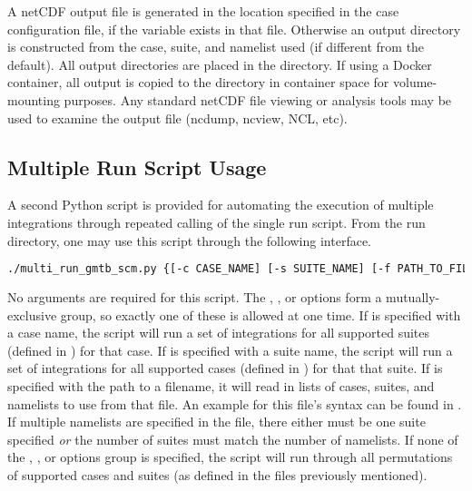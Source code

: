 A netCDF output file is generated in the location specified in the case
configuration file, if the  variable exists in that file. Otherwise an output directory is constructed from the case, suite, and namelist used (if different from the default). All output directories are placed in the  directory. If using a Docker container, all output is copied to the  directory in container space for volume-mounting purposes. Any standard netCDF file viewing or analysis tools may be used to
examine the output file (ncdump, ncview, NCL, etc).

\subsection{Multiple Run Script Usage}\label{subsection: multirunscript}

A second Python script is provided for automating the execution of multiple integrations through repeated calling of the single run script. From the run directory, one may use this script through the following interface.

\begin{lstlisting}[language=bash]
./multi_run_gmtb_scm.py {[-c CASE_NAME] [-s SUITE_NAME] [-f PATH_TO_FILE]} [-v{v}] [-t] [-d]
\end{lstlisting}

No arguments are required for this script. The , , or  options form a mutually-exclusive group, so exactly one of these is allowed at one time. If  is specified with a case name, the script will run a set of integrations for all supported suites (defined in ) for that case. If  is specified with a suite name, the script will run a set of integrations for all supported cases (defined in ) for that that suite. If  is specified with the path to a filename, it will read in lists of cases, suites, and namelists to use from that file. An example for this file's syntax can be found in . If multiple namelists are specified in the file, there either must be one suite specified \emph{or} the number of suites must match the number of namelists. If none of the , , or  options group is specified, the script will run through all permutations of supported cases and suites (as defined in the files previously mentioned).

